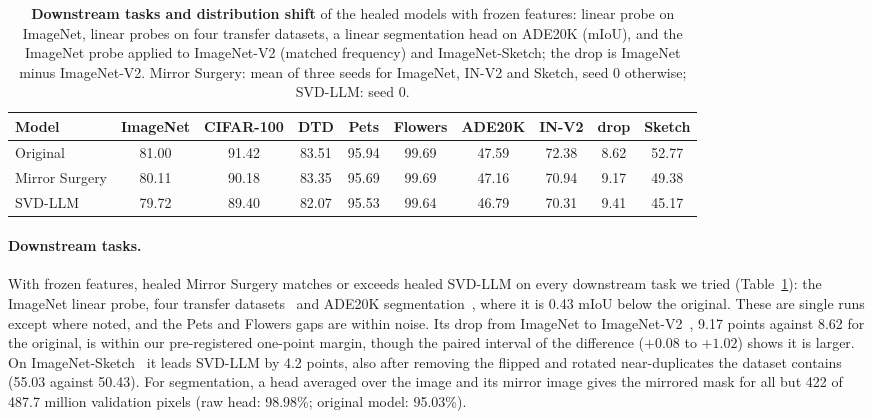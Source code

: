 \begin{table}[t]
  \centering
  \small
  \caption{\textbf{Downstream tasks and distribution shift} of the healed models with frozen features: linear probe
  on ImageNet, linear probes on four transfer datasets, a linear segmentation head on ADE20K (mIoU), and the ImageNet
  probe applied to ImageNet-V2 (matched frequency) and ImageNet-Sketch; the drop is ImageNet minus ImageNet-V2.
  Mirror Surgery: mean of three seeds for ImageNet, IN-V2 and Sketch, seed 0 otherwise; SVD-LLM: seed 0.}
  \label{tab:downstream}
  \setlength{\tabcolsep}{4pt}
  \begin{tabular}{lccccccccc}
    \toprule
    Model & ImageNet & CIFAR-100 & DTD & Pets & Flowers & ADE20K & IN-V2 & drop & Sketch \\
    \midrule
    Original       & 81.00 & 91.42 & 83.51 & 95.94 & 99.69 & 47.59 & 72.38 & 8.62 & 52.77 \\
    Mirror Surgery & 80.11 & 90.18 & 83.35 & 95.69 & 99.69 & 47.16 & 70.94 & 9.17 & 49.38 \\
    SVD-LLM        & 79.72 & 89.40 & 82.07 & 95.53 & 99.64 & 46.79 & 70.31 & 9.41 & 45.17 \\
    \bottomrule
  \end{tabular}
\end{table}

\paragraph{Downstream tasks.}
With frozen features, healed Mirror Surgery matches or exceeds healed SVD-LLM on every downstream task we tried
(Table~\ref{tab:downstream}): the ImageNet linear probe, four transfer
datasets~\citep{krizhevsky2009learning,cimpoi2014describing,parkhi2012cats,nilsback2008automated} and ADE20K
segmentation~\citep{zhou2017scene}, where it is 0.43 mIoU below the original. These are single runs except where noted,
and the Pets and Flowers gaps are within noise. Its drop from ImageNet to ImageNet-V2~\citep{recht2019imagenet}, 9.17
points against 8.62 for the original, is within our pre-registered one-point margin, though the paired interval of the
difference ($+0.08$ to $+1.02$) shows it is larger. On ImageNet-Sketch~\citep{wang2019learning} it leads SVD-LLM by 4.2
points, also after removing the flipped and rotated near-duplicates the dataset contains (55.03 against 50.43). For
segmentation, a head averaged over the image and its mirror image gives the mirrored mask for all but 422 of 487.7
million validation pixels (raw head: 98.98\%; original model: 95.03\%).

